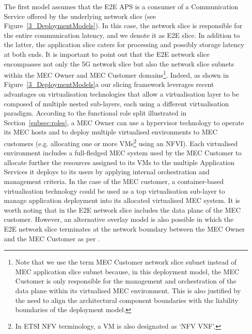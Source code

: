 The first model assumes that the E2E APS is a consumer of a Communication Service offered by the underlying network slice (see Figure~\ref{3_DeploymentModels}). In this case, the network slice is responsible for the entire communication latency, and we denote it as E2E  slice. In addition to the latter, the application slice caters for processing and possibly storage latency at both ends. It is important to point out that the E2E network slice encompasses not only the 5G network slice but also the network slice subnets within the MEC Owner and MEC Customer domains\footnote{Note that we use the term MEC Customer network slice subnet instead of MEC application slice subnet because, in this deployment model, the MEC Customer is only responsible for the management and orchestration of the data plane within its virtualised MEC environment. This is also justified by the need to align the architectural component boundaries with the liability boundaries of the deployment model.}. Indeed, as shown in Figure~\ref{3_DeploymentModels}a our slicing framework leverages recent advantages on virtualisation technologies that allow a virtualisation layer to be composed of multiple nested sub-layers, each using a different virtualisation paradigm. According to the functional role split illustrated in Section~\ref{subsec:roles}, a MEC Owner can use a hypervisor technology to operate its MEC hosts and to deploy multiple virtualised environments to MEC customers (e.g. allocating one or more VMs\footnote{In ETSI NFV terminology, a VM is also designated as `NFV VNF'.} using an NFVI). Each virtualised environment includes a full-fledged MEC system used by the MEC Customer to allocate further the resources assigned to its VMs to the multiple Application Services it deploys to its users by applying internal orchestration and management criteria. In the case of the MEC customer, a container-based virtualisation technology could be used as a top virtualisation sub-layer to manage application deployment into its allocated virtualised MEC system. It is worth noting that in  the E2E network slice includes the data plane of the MEC customer. However, an alternative overlay model is also possible in which the E2E network slice terminates at the network boundary between the MEC Owner and the MEC Customer as per .

